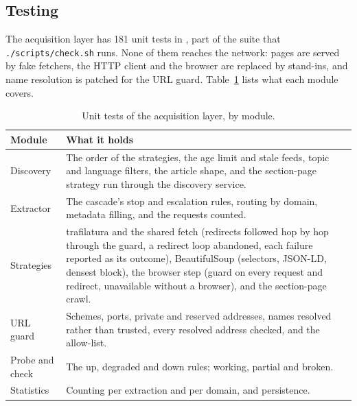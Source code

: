 
\subsection{Testing}
\label{subsec:scraping-testing}

The acquisition layer has 181 unit tests in
, part of the suite that
\texttt{./scripts/check.sh} runs. None of them reaches the network:
pages are served by fake fetchers, the HTTP client and the browser are
replaced by stand-ins, and name resolution is patched for the URL
guard. Table~\ref{tab:scraping-tests} lists what each module covers.

\begin{table}[ht]
\centering
\small
\caption{Unit tests of the acquisition layer, by module.}
\label{tab:scraping-tests}
\begin{tabularx}{\linewidth}{@{}lX@{}}
\toprule
Module & What it holds \\
\midrule
Discovery             & The order of the strategies, the age limit and
                        stale feeds, topic and language filters, the
                        article shape, and the section-page strategy run
                        through the discovery service. \\
Extractor             & The cascade's stop and escalation rules, routing
                        by domain, metadata filling, and the requests
                        counted. \\
Strategies            & trafilatura and the shared fetch (redirects
                        followed hop by hop through the guard, a
                        redirect loop abandoned, each failure reported
                        as its outcome), BeautifulSoup (selectors,
                        JSON-LD, densest block), the browser step (guard
                        on every request and redirect, unavailable
                        without a browser), and the section-page
                        crawl. \\
URL guard             & Schemes, ports, private and reserved addresses,
                        names resolved rather than trusted, every
                        resolved address checked, and the allow-list. \\
Probe and check       & The up, degraded and down rules; working,
                        partial and broken. \\
Statistics            & Counting per extraction and per domain, and
                        persistence. \\
\bottomrule
\end{tabularx}
\end{table}


